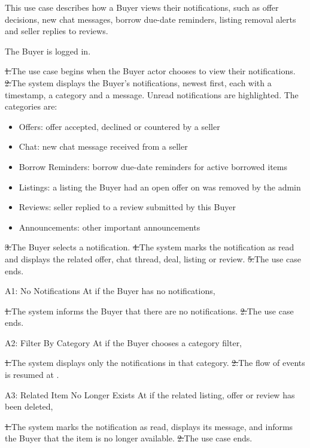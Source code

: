 This use case describes how a Buyer views their notifications, such as offer decisions, new chat messages, borrow due-date reminders, listing removal alerts and seller replies to reviews.\par
{}
The Buyer is logged in.\par
{}
\st{1.}{The use case begins when the Buyer actor chooses to view their notifications.}
\st{2.}{The system displays the Buyer's notifications, newest first, each with a timestamp, a category and a message. Unread notifications are highlighted. The categories are:}
\begin{itemize}
  \item Offers: offer accepted, declined or countered by a seller
  \item Chat: new chat message received from a seller
  \item Borrow Reminders: borrow due-date reminders for active borrowed items
  \item Listings: a listing the Buyer had an open offer on was removed by the admin
  \item Reviews: seller replied to a review submitted by this Buyer
  \item Announcements: other important announcements
\end{itemize}
\st{3.}{The Buyer selects a notification.}
\st{4.}{The system marks the notification as read and displays the related offer, chat thread, deal, listing or review.}
\st{5.}{The use case ends.}
\begin{flowblock}{A1: No Notifications}
At  if the Buyer has no notifications,\par
\st{1.}{The system informs the Buyer that there are no notifications.}
\st{2.}{The use case ends.}
\end{flowblock}
\begin{flowblock}{A2: Filter By Category}
At  if the Buyer chooses a category filter,\par
\st{1.}{The system displays only the notifications in that category.}
\st{2.}{The flow of events is resumed at .}
\end{flowblock}
\begin{flowblock}{A3: Related Item No Longer Exists}
At  if the related listing, offer or review has been deleted,\par
\st{1.}{The system marks the notification as read, displays its message, and informs the Buyer that the item is no longer available.}
\st{2.}{The use case ends.}
\end{flowblock}

